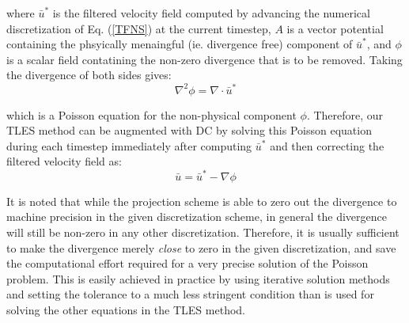 where $\bar{u}^*$ is the filtered velocity field computed by advancing the numerical discretization of Eq. (\ref{TFNS}) at the current timestep, $A$ is a vector potential containing the phsyically menaingful (ie. divergence free) component of $\bar{u}^*$, and $\phi$ is a scalar field contatining the non-zero divergence that is to be removed. Taking the divergence of both sides gives:
\begin{equation}
\nabla^2 \phi=\nabla\cdot\bar{u}^*
\end{equation}

which is a Poisson equation for the non-physical component $\phi$. Therefore, our TLES method can be augmented with DC by solving this Poisson equation during each timestep immediately after computing $\bar{u}^*$ and then correcting the filtered velocity field as:
\begin{equation}
\bar{u}=\bar{u}^*-\nabla\phi
\end{equation}

It is noted that while the projection scheme is able to zero out the divergence to machine precision in the given discretization scheme, in general the divergence will still be non-zero in any other discretization. Therefore, it is usually sufficient to make the divergence merely \emph{close} to zero in the given discretization, and save the computational effort required for a very precise solution of the Poisson problem. This is easily achieved in practice by using iterative solution methods and setting the tolerance to a much less stringent condition than is used for solving the other equations in the TLES method.
